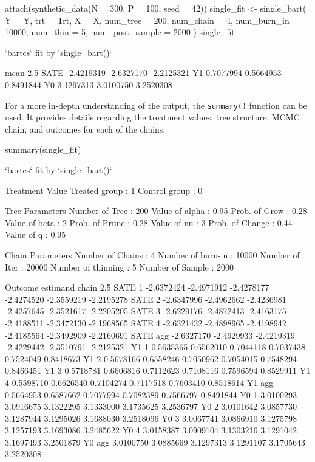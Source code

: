 \begin{example}
attach(synthetic_data(N = 300, P = 100, seed = 42))
single_fit <- single_bart(
    Y = Y, trt = Trt, X = X, 
    num_tree = 200, num_chain = 4, 
    num_burn_in = 10000, num_thin = 5, num_post_sample = 2000
  )
single_fit

`bartcs` fit by `single_bart()`

           mean       2.5%
SATE -2.4219319 -2.6327170 -2.2125321
Y1    0.7077994  0.5664953  0.8491844
Y0    3.1297313  3.0100750  3.2520308
\end{example}
For a more in-depth understanding of the output, the \verb|summary()| function can be used. It provides
details regarding the treatment values, tree structure, MCMC chain, and outcomes for each of the
chains.
\begin{example}
summary(single_fit)

`bartcs` fit by `single_bart()`

Treatment Value
  Treated group    :      1
  Control group    :      0

Tree Parameters
  Number of Tree   :    200		Value  of alpha    :   0.95
  Prob.  of Grow   :   0.28		Value  of beta     :      2
  Prob.  of Prune  :   0.28		Value  of nu       :      3
  Prob.  of Change :   0.44		Value  of q        :   0.95

Chain Parameters
  Number of Chains :      4		Number of burn-in  :  10000
  Number of Iter   :  20000		Number of thinning :      5
  Number of Sample :   2000

Outcome 
 estimand chain       2.5%
      SATE    1 -2.6372424 -2.4971912 -2.4278177 -2.4274520 -2.3559219 -2.2195278
      SATE    2 -2.6347996 -2.4962662 -2.4236981 -2.4257645 -2.3521617 -2.2205205
      SATE    3 -2.6229176 -2.4872413 -2.4163175 -2.4188511 -2.3472130 -2.1968565
      SATE    4 -2.6321432 -2.4898965 -2.4198942 -2.4185564 -2.3492909 -2.2160691
      SATE  agg -2.6327170 -2.4929933 -2.4219319 -2.4229442 -2.3510791 -2.2125321
       Y1     1  0.5635365  0.6562010  0.7044118  0.7037438  0.7524049  0.8418673
       Y1     2  0.5678166  0.6558246  0.7050962  0.7054015  0.7548294  0.8466451
       Y1     3  0.5718781  0.6606816  0.7112623  0.7108116  0.7596594  0.8529911
       Y1     4  0.5598710  0.6626540  0.7104274  0.7117518  0.7603410  0.8518614
       Y1   agg  0.5664953  0.6587662  0.7077994  0.7082389  0.7566797  0.8491844
       Y0     1  3.0100293  3.0916675  3.1322295  3.1333000  3.1735625  3.2536797
       Y0     2  3.0101642  3.0857730  3.1287944  3.1295026  3.1688030  3.2518096
       Y0     3  3.0067741  3.0866910  3.1275798  3.1257193  3.1693086  3.2485622
       Y0     4  3.0158387  3.0909104  3.1303216  3.1291042  3.1697493  3.2501879
       Y0   agg  3.0100750  3.0885669  3.1297313  3.1291107  3.1705643  3.2520308
\end{example}

